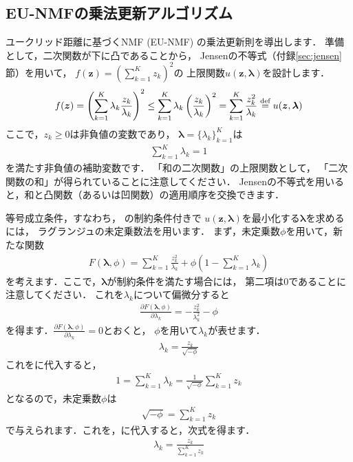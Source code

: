 \subsection{EU-NMFの乗法更新アルゴリズム}

ユークリッド距離に基づくNMF (EU-NMF) の乗法更新則を導出します．
準備として，二次関数が下に凸であることから，
Jensenの不等式（付録\ref{sec:jensen}節）を用いて，
$f(\bm{z}) = \left(\sum_{k=1}^K z_k\right)^2$の
上限関数$u(\bm{z},\bm\lambda)$を設計します．
\begin{align}
f(\bm{z}) 
= \left(\sum_{k=1}^K \lambda_k \frac{z_k}{\lambda_k}\right)^2
\le \sum_{k=1}^K \lambda_k \left(\frac{z_k}{\lambda_k}\right)^2
= \sum_{k=1}^K \frac{z_k^2}{\lambda_k}
\overset{\mbox{\scriptsize{def}}}{=}
u(\bm{z},\bm\lambda)
\label{eqn:quad_aux}
\end{align}
ここで，$z_k \ge 0$は非負値の変数であり，
$\bm\lambda = \{\lambda_k\}_{k=1}^K$は
\begin{align}
\sum_{k=1}^K \lambda_k = 1
\label{eqn:eu_lambda_constraint}
\end{align}
を満たす非負値の補助変数です．
「和の二次関数」の上限関数として，
「二次関数の和」が得られていることに注意してください．
Jensenの不等式を用いると，和と凸関数（あるいは凹関数）の適用順序を交換できます．

等号成立条件，すなわち，
の制約条件付きで
$u(\bm{z},\bm\lambda)$を最小化する$\bm\lambda$を求めるには，
ラグランジュの未定乗数法を用います．
まず，未定乗数$\phi$を用いて，新たな関数
\begin{align}
F(\bm\lambda,\phi) = \sum_{k=1}^K \frac{z_k^2}{\lambda_k} + \phi \left(1 - \sum_{k=1}^K \lambda_k\right)
\end{align}
を考えます．ここで，$\bm\lambda$が制約条件を満たす場合には，
第二項は$0$であることに注意してください．
これを$\lambda_k$について偏微分すると
\begin{align}
\frac{\partial F(\bm\lambda,\phi)}{\partial\lambda_k} = - \frac{z_k^2}{\lambda_k^2} - \phi
\end{align}
を得ます．$\frac{\partial F(\bm\lambda,\phi)}{\partial\lambda_k} = 0$とおくと，
$\phi$を用いて$\lambda_k$が表せます．
\begin{align}
\lambda_k = \frac{z_k}{\sqrt{-\phi}}
\label{eqn:lambda_k_eu_nmf}
\end{align}
これをに代入すると，
\begin{align}
1 = \sum_{k=1}^K \lambda_k = \frac{1}{\sqrt{-\phi}}\sum_{k=1}^K z_k
\end{align}
となるので，未定乗数$\phi$は
\begin{align}
\sqrt{-\phi} = \sum_{k=1}^K z_k
\end{align}
で与えられます．これを，に代入すると，次式を得ます．
\begin{align}
\lambda_k = \frac{z_k}{\sum_{k=1}^K z_k}
\end{align}

